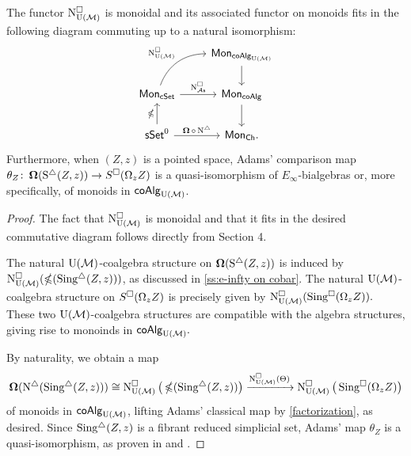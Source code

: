 \begin{nntheorem}
	The functor $\cchainsUM$ is monoidal and its associated functor on monoids fits in the following diagram commuting up to a natural isomorphism:
	\begin{equation*}
	\begin{tikzcd}
	& \Mon_{\coAlg_\UM} \arrow[d] \\
	\Mon_{\cSet} \arrow[ru, "\cchainsUM", out=70, in=180] \arrow[r, "\cchainsAS"]
	& \Mon_{\coAlg} \arrow[d] \\
	\sSet^0 \arrow[r, "\cobar \circ \schains"] \arrow[u, "\ccobar"]
	& \Mon_{\Ch}.
	\end{tikzcd}
	\end{equation*}
	Furthermore, when $(Z, z)$ is a pointed space, Adams' comparison map $\theta_Z \colon \cobar(\sS(Z, z)) \to S^{\cube}(\Omega_z Z)$ is a quasi-isomorphism of $E_{\infty}$-bialgebras or, more specifically, of monoids in $\coAlg_\UM$.
\end{nntheorem} 

\begin{proof}
	The fact that $\cchainsUM$ is monoidal and that it fits in the desired commutative diagram follows directly from Section 4.
	    
	The natural $\UM$-coalgebra structure on $\cobar(\sS(Z, z))$ is induced by $\cchainsUM ( \ccobar (\sSing(Z, z)) )$, as discussed in \cref{ss:e-infty on cobar}.
	The natural $\UM$-coalgebra structure on $S^{\cube}(\Omega_z Z)$ is precisely given by $\cchainsUM( \cSing(\Omega_z Z) ).$ These two $\UM$-coalgebra structures are compatible with the algebra structures, giving rise to monoinds in $\coAlg_{\UM}.$
	     
	By naturality, we obtain a map
	\begin{equation*}
	\cobar(\schains(\sSing(Z, z))) \cong
	\cchainsUM \big( \ccobar(\sSing(Z, z)) \big) \xra{\cchainsUM(\Theta)}
	\cchainsUM \big( \cSing(\Omega_z Z) \big)
	\end{equation*}
	of monoids in $\coAlg_{\UM}$, lifting Adams' classical map by \cref{factorization}, as desired.
	Since $\sSing(Z, z)$ is a fibrant reduced simplicial set, Adams' map $\theta_Z$ is a quasi-isomorphism, as proven in \cite{rivera2018cubical} and \cite{rivera2019path}. 
\end{proof}

